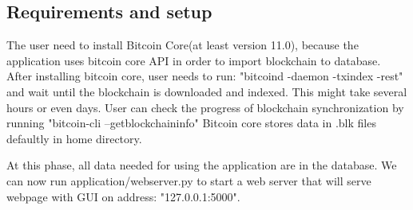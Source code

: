 \documentclass[
  digital, %
  table,   %
  lof,     %
  lot,     %
  oneside
]{fithesis3}
\begin{document}
\begin{appendices}
\chapter{Requirements and setup }

The user need to install Bitcoin Core(at least version 11.0), because 
the application uses bitcoin core API in order to import blockchain to database.
After installing bitcoin core, user needs to run:
"bitcoind -daemon -txindex -rest"
and wait until the blockchain is downloaded and indexed. This might take several hours or even days.
User can check the progress of blockchain synchronization by running
"bitcoin-cli --getblockchaininfo"
Bitcoin core stores data in .blk files defaultly in home directory.

At this phase, all data needed for using the application are in the database. We can now run application/webserver.py
to start a web server that will serve webpage with GUI on address: "127.0.0.1:5000".



\end{appendices}

\printbibliography
\end{document}
